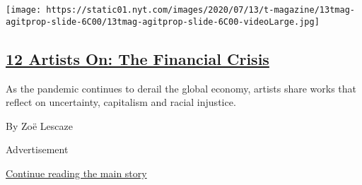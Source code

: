 \begin{enumerate}
  \texttt{[image: https://static01.nyt.com/images/2020/07/13/t-magazine/13tmag-agitprop-slide-6C00/13tmag-agitprop-slide-6C00-videoLarge.jpg]}

  \hypertarget{12-artists-on-the-financial-crisis}{%
  \subsection{\texorpdfstring{\href{/2020/07/21/t-magazine/art-financial-crisis.html}{12
  Artists On: The Financial
  Crisis}}{12 Artists On: The Financial Crisis}}\label{12-artists-on-the-financial-crisis}}

  As the pandemic continues to derail the global economy, artists share
  works that reflect on uncertainty, capitalism and racial injustice.

  By Zoë Lescaze
\end{enumerate}

Advertisement

\protect\hyperlink{after-mid1}{Continue reading the main story}

\subsection{\texorpdfstring{\protect\hyperlink{}{}}{}}

